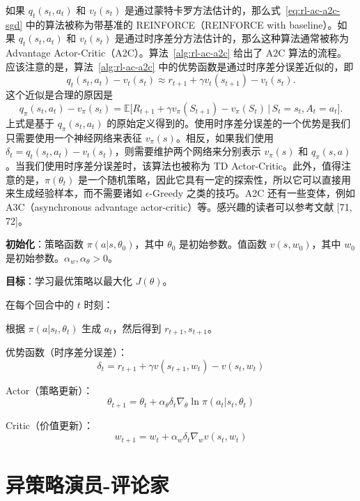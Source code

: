 如果 $q_{t}(s_{t}, a_{t})$ 和 $v_{t}(s_{t})$ 是通过蒙特卡罗方法估计的，那么式~\eqref{eq:rl-ac-a2c-sgd} 中的算法被称为带基准的 REINFORCE（REINFORCE with baseline）。如果 $q_{t}(s_{t}, a_{t})$ 和 $v_{t}(s_{t})$ 是通过时序差分方法估计的，那么这种算法通常被称为 Advantage Actor-Critic（A2C）。算法~\ref{alg:rl-ac-a2c} 给出了 A2C 算法的流程。应该注意的是，算法~\ref{alg:rl-ac-a2c} 中的优势函数是通过时序差分误差近似的，即
\[
q_{t}(s_{t}, a_{t}) - v_{t}(s_{t}) \approx r_{t+1} + \gamma v_{t}(s_{t+1}) - v_{t}(s_{t}).
\]
这个近似是合理的原因是
\[
q_{\pi}(s_{t}, a_{t}) - v_{\pi}(s_{t}) = \mathbb{E} \Big[ R_{t+1} + \gamma v_{\pi}(S_{t+1}) - v_{\pi}(S_{t}) \,\big|\, S_{t} = s_{t}, A_{t} = a_{t} \Big].
\]
上式是基于 $q_{\pi}(s_{t}, a_{t})$ 的原始定义得到的。使用时序差分误差的一个优势是我们只需要使用一个神经网络来表征 $v_{\pi}(s)$。相反，如果我们使用 $\delta_{t} = q_{t}(s_{t}, a_{t}) - v_{t}(s_{t})$，则需要维护两个网络来分别表示 $v_{\pi}(s)$ 和 $q_{\pi}(s, a)$。当我们使用时序差分误差时，该算法也被称为 TD Actor-Critic。此外，值得注意的是，$\pi(\theta_{t})$ 是一个随机策略，因此它具有一定的探索性，所以它可以直接用来生成经验样本，而不需要诸如 $\epsilon$-Greedy 之类的技巧。A2C 还有一些变体，例如 A3C（asynchronous advantage actor-critic）等。感兴趣的读者可以参考文献 [71, 72]。

\begin{algo}\label{alg:rl-ac-a2c}
\textbf{初始化}：策略函数 $\pi(a | s, \theta_{0})$，其中 $\theta_{0}$ 是初始参数。值函数 $v(s, w_{0})$，其中 $w_{0}$ 是初始参数。$\alpha_{w}, \alpha_{\theta} > 0$。

\textbf{目标}：学习最优策略以最大化 $J(\theta)$。

在每个回合中的 $t$ 时刻：

\quad 根据 $\pi(a | s_{t}, \theta_{t})$ 生成 $a_{t}$，然后得到 $r_{t+1}, s_{t+1}$。

\quad 优势函数（时序差分误差）：
\[
\delta_{t} = r_{t+1} + \gamma v(s_{t+1}, w_{t}) - v(s_{t}, w_{t})
\]

\quad Actor（策略更新）：
\[
\theta_{t+1} = \theta_{t} + \alpha_{\theta} \delta_{t} \nabla_{\theta} \ln \pi(a_{t} | s_{t}, \theta_{t})
\]

\quad Critic（价值更新）：
\[
w_{t+1} = w_{t} + \alpha_{w} \delta_{t} \nabla_{w} v(s_{t}, w_{t})
\]
\end{algo}

\section{异策略演员-评论家}
\label{sec:rl-ac-offpolicy}

